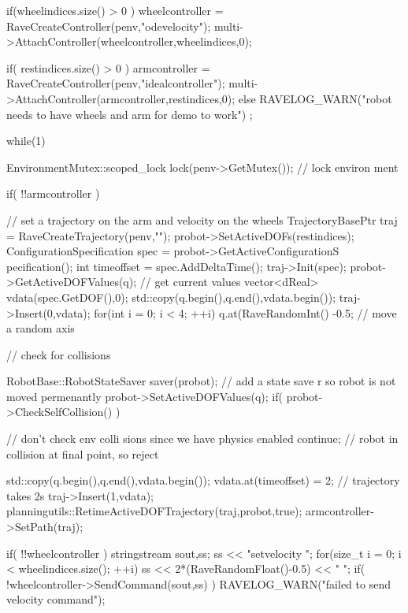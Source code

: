 \begin{DoxyCodeInclude}
{{        if(wheelindices.size() > 0 ) {
            wheelcontroller = RaveCreateController(penv,"odevelocity");
            multi->AttachController(wheelcontroller,wheelindices,0);
        }

        if( restindices.size() > 0 ) {
            armcontroller = RaveCreateController(penv,"idealcontroller");
            multi->AttachController(armcontroller,restindices,0);
        }
        else {
            RAVELOG_WARN("robot needs to have wheels and arm for demo to work\n")
      ;
        }
    }

    while(1) {
        {
            EnvironmentMutex::scoped_lock lock(penv->GetMutex()); // lock environ
      ment

            if( !!armcontroller ) {
                // set a trajectory on the arm and velocity on the wheels
                TrajectoryBasePtr traj = RaveCreateTrajectory(penv,"");
                probot->SetActiveDOFs(restindices);
                ConfigurationSpecification spec = probot->GetActiveConfigurationS
      pecification();
                int timeoffset = spec.AddDeltaTime();
                traj->Init(spec);
                probot->GetActiveDOFValues(q); // get current values
                vector<dReal> vdata(spec.GetDOF(),0);
                std::copy(q.begin(),q.end(),vdata.begin());
                traj->Insert(0,vdata);
                for(int i = 0; i < 4; ++i) {
                    q.at(RaveRandomInt()%
      -0.5; // move a random axis
                }

                // check for collisions
                {
                    RobotBase::RobotStateSaver saver(probot); // add a state save
      r so robot is not moved permenantly
                    probot->SetActiveDOFValues(q);
                    if( probot->CheckSelfCollision() ) { // don't check env colli
      sions since we have physics enabled
                        continue; // robot in collision at final point, so reject
      
                    }
                }

                std::copy(q.begin(),q.end(),vdata.begin());
                vdata.at(timeoffset) = 2; // trajectory takes 2s
                traj->Insert(1,vdata);
                planningutils::RetimeActiveDOFTrajectory(traj,probot,true);
                armcontroller->SetPath(traj);
            }

            if( !!wheelcontroller ) {
                stringstream sout,ss; ss << "setvelocity ";
                for(size_t i = 0; i < wheelindices.size(); ++i) {
                    ss << 2*(RaveRandomFloat()-0.5) << " ";
                }
                if( !wheelcontroller->SendCommand(sout,ss) ) {
                    RAVELOG_WARN("failed to send velocity command\n");
                }
            }
        }

}}
\end{DoxyCodeInclude}
